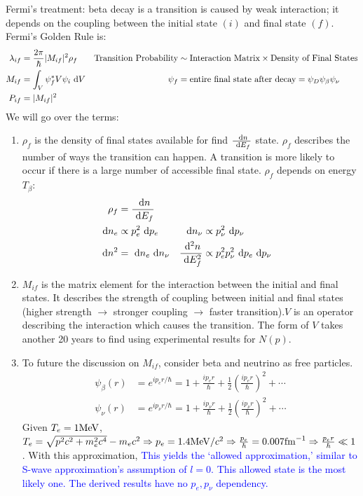 \documentclass{school-22.101-notes}
\begin{document}
Fermi's treatment: beta decay is a transition is caused by weak interaction; it depends on the coupling between the initial state $(i)$ and final state $(f)$. Fermi's Golden Rule is:
\begin{align}
\lambda_{if} &= \frac{2\pi}{\hbar} |M_{if}|^2 \rho_f  & \mbox{Transition Probability} &\sim \mbox{Interaction Matrix} \times \mbox{Density of Final States} \\
M_{if} &= \int_{V} \psi_f^* V \psi_i \mbox{ }\mathrm{d} V   &  \psi_f &= \mbox{entire final state after decay} = \psi_D \psi_{\beta} \psi_{\nu} \\
P_{if} &= |M_{if}|^2
\end{align}
We will go over the terms:
\begin{enumerate}
\item $\rho_{f}$ is the density of final states available for find $\frac{\mbox{ }\mathrm{d} n}{\mbox{ }\mathrm{d} E_f}$ state. $\rho_f$ describes the number of ways the transition can happen. A transition is more likely to occur if there is a large number of accessible final state. $\rho_f$ depends on energy $T_{\beta}$: 
\begin{align}
\rho_f &= \frac{\mbox{ }\mathrm{d} n}{\mbox{ }\mathrm{d} E_f} \\ 
\mbox{ }\mathrm{d} n_{e} &\propto p_{e}^2  \mbox{ }\mathrm{d} p_{e} & \mbox{ }\mathrm{d} n_{\nu} &\propto p_{\nu}^2 \mbox{ }\mathrm{d} p_{\nu} \\
\mbox{ }\mathrm{d} n^2 &= \mbox{ }\mathrm{d} n_{e} \mbox{ }\mathrm{d} n_{\nu} & \frac{\mbox{ }\mathrm{d}^2 n}{\mbox{ }\mathrm{d} E_f^2} &\propto p_{e}^2 p_{\nu}^2 \mbox{ }\mathrm{d} p_{e} \mbox{ }\mathrm{d} p_{\nu}  
\end{align}
%
\item $M_{if}$ is the matrix element for the interaction between the initial and final states. It describes the strength of coupling between initial and final states (higher strength $\to$ stronger coupling $\to$ faster transition).$V$ is an operator describing the interaction which causes the transition. The form of $V$ takes another 20 years to find using experimental results for $N(p)$.
\item To future the discussion on $M_{if}$, consider beta and neutrino as free particles. 
\begin{align}
\psi_{\beta} (r) &= e^{i p_{e} r /\hbar} = 1+ \frac{i p_{e} r }{\hbar} + \frac{1}{2} \left(\frac{i p_{e} r }{\hbar} \right)^2 + \cdots \label{beta-wavefunction}\\
\psi_{\nu} (r) &= e^{i p_{\nu} r /\hbar} = 1+ \frac{i p_{\nu} r }{\hbar} + \frac{1}{2} \left(\frac{i p_{\nu} r }{\hbar} \right)^2 + \cdots 
\end{align}
Given $T_{e} = 1 \mathrm{MeV}$, $T_e = \sqrt{p^2 c^2 + m_e^2 c^4} - m_e c^2 \Rightarrow p_{e} = 1.4 \mathrm{MeV}/c^2 \Rightarrow \frac{p_{e}}{\hbar} = 0.007 \mathrm{fm}^{-1} \Rightarrow \frac{p_e r}{\hbar} \ll 1$. With this approximation,
\textcolor{blue}{This yields the `allowed approximation,' similar to S-wave approximation's assumption of $l=0$. This allowed state is the most likely one. The derived results have no $p_e, p_{\nu}$ dependency.}
\end{enumerate}
\end{document}
